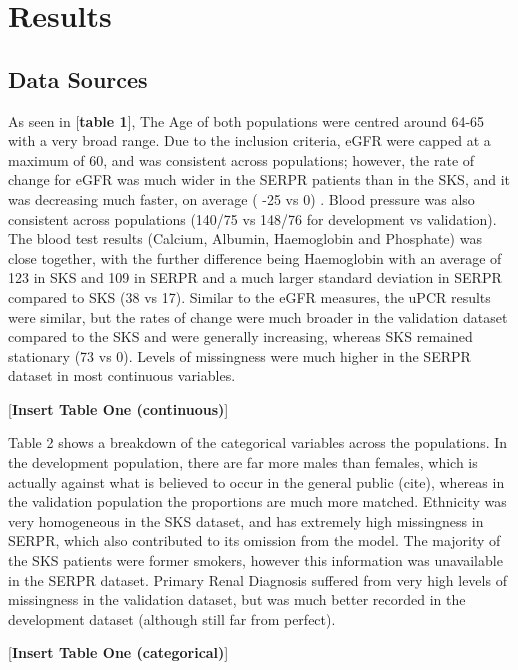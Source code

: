 \documentclass[12pt,twoside]{reedthesis}
\begin{document}
\hypertarget{results-1}{%
\section{Results}\label{results-1}}

\hypertarget{data-sources-1}{%
\subsection{Data Sources}\label{data-sources-1}}

As seen in {[}\textbf{table 1}{]}, The Age of both populations were centred around 64-65 with a very broad range. Due to the inclusion criteria, eGFR were capped at a maximum of 60, and was consistent across populations; however, the rate of change for eGFR was much wider in the SERPR patients than in the SKS, and it was decreasing much faster, on average ( -25 vs 0) . Blood pressure was also consistent across populations (140/75 vs 148/76 for development vs validation). The blood test results (Calcium, Albumin, Haemoglobin and Phosphate) was close together, with the further difference being Haemoglobin with an average of 123 in SKS and 109 in SERPR and a much larger standard deviation in SERPR compared to SKS (38 vs 17). Similar to the eGFR measures, the uPCR results were similar, but the rates of change were much broader in the validation dataset compared to the SKS and were generally increasing, whereas SKS remained stationary (73 vs 0). Levels of missingness were much higher in the SERPR dataset in most continuous variables.

{[}\textbf{Insert Table One (continuous)}{]}

Table 2 shows a breakdown of the categorical variables across the populations. In the development population, there are far more males than females, which is actually against what is believed to occur in the general public (cite), whereas in the validation population the proportions are much more matched. Ethnicity was very homogeneous in the SKS dataset, and has extremely high missingness in SERPR, which also contributed to its omission from the model. The majority of the SKS patients were former smokers, however this information was unavailable in the SERPR dataset. Primary Renal Diagnosis suffered from very high levels of missingness in the validation dataset, but was much better recorded in the development dataset (although still far from perfect).

{[}\textbf{Insert Table One (categorical)}{]}
\end{document}
